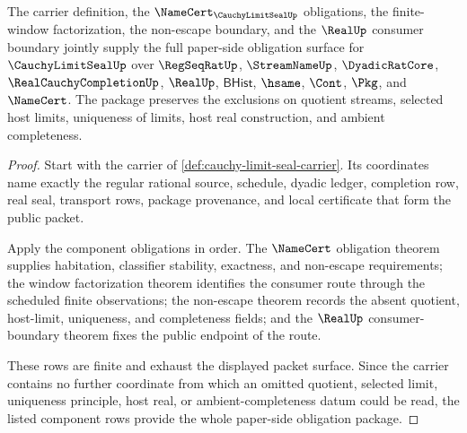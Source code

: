 \begin{theorem}
\label{thm:cauchy-limit-seal-obligation-closure-package}
The carrier definition, the $\NameCert_{\CauchyLimitSealUp}$ obligations, the finite-window factorization, the non-escape boundary, and the $\RealUp$ consumer boundary jointly supply the full paper-side obligation surface for $\CauchyLimitSealUp$ over $\RegSeqRatUp$, $\StreamNameUp$, $\DyadicRatCore$, $\RealCauchyCompletionUp$, $\RealUp$, $\mathsf{BHist}$, $\hsame$, $\Cont$, $\Pkg$, and $\NameCert$. The package preserves the exclusions on quotient streams, selected host limits, uniqueness of limits, host real construction, and ambient completeness.
\end{theorem}
\begin{proof}
Start with the carrier of \autoref{def:cauchy-limit-seal-carrier}. Its coordinates name exactly the regular rational source, schedule, dyadic ledger, completion row, real seal, transport rows, package provenance, and local certificate that form the public packet.

Apply the component obligations in order. The $\NameCert$ obligation theorem supplies habitation, classifier stability, exactness, and non-escape requirements; the window factorization theorem identifies the consumer route through the scheduled finite observations; the non-escape theorem records the absent quotient, host-limit, uniqueness, and completeness fields; and the $\RealUp$ consumer-boundary theorem fixes the public endpoint of the route.

These rows are finite and exhaust the displayed packet surface. Since the carrier contains no further coordinate from which an omitted quotient, selected limit, uniqueness principle, host real, or ambient-completeness datum could be read, the listed component rows provide the whole paper-side obligation package.
\end{proof}

